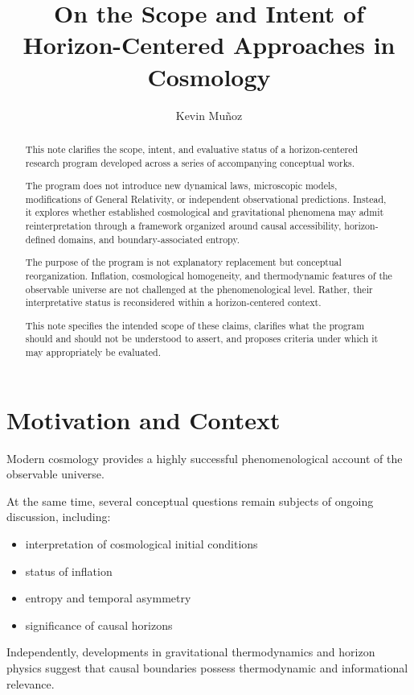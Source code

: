 \documentclass[12pt,a4paper]{article}
\title{On the Scope and Intent of Horizon-Centered Approaches in Cosmology}
\author{Kevin Mu\~noz}
\date{}
\begin{document}
\maketitle

\begin{abstract}
This note clarifies the scope, intent, and evaluative status of a horizon-centered research program developed across a series of accompanying conceptual works.

The program does not introduce new dynamical laws, microscopic models, modifications of General Relativity, or independent observational predictions. Instead, it explores whether established cosmological and gravitational phenomena may admit reinterpretation through a framework organized around causal accessibility, horizon-defined domains, and boundary-associated entropy.

The purpose of the program is not explanatory replacement but conceptual reorganization. Inflation, cosmological homogeneity, and thermodynamic features of the observable universe are not challenged at the phenomenological level. Rather, their interpretative status is reconsidered within a horizon-centered context.

This note specifies the intended scope of these claims, clarifies what the program should and should not be understood to assert, and proposes criteria under which it may appropriately be evaluated.
\end{abstract}

\section{Motivation and Context}

Modern cosmology provides a highly successful phenomenological account of the observable universe.

At the same time, several conceptual questions remain subjects of ongoing discussion, including:

\begin{itemize}
  \item interpretation of cosmological initial conditions
  \item status of inflation
  \item entropy and temporal asymmetry
  \item significance of causal horizons
\end{itemize}

Independently, developments in gravitational thermodynamics and horizon physics suggest that causal boundaries possess thermodynamic and informational relevance.
\end{document}

